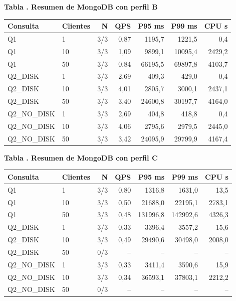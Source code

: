 \documentclass[12pt,letterpaper]{article}
\begin{document}
\par\begin{minipage}{\textwidth}\begin{center}\textbf{Tabla \thetable. Resumen de MongoDB con perfil B}\par\small\begin{tabular}{llrrrrr}\toprule Consulta & Clientes & N & QPS & P95 ms & P99 ms & CPU s \\ \midrule
Q1 & 1 & 3/3 & 0,87 & 1195,7 & 1221,5 & 0,4 \\
Q1 & 10 & 3/3 & 1,09 & 9899,1 & 10095,4 & 2429,2 \\
Q1 & 50 & 3/3 & 0,84 & 66195,5 & 69897,8 & 4103,7 \\
Q2\_DISK & 1 & 3/3 & 2,69 & 409,3 & 429,0 & 0,4 \\
Q2\_DISK & 10 & 3/3 & 4,01 & 2805,7 & 3000,1 & 2437,1 \\
Q2\_DISK & 50 & 3/3 & 3,40 & 24600,8 & 30197,7 & 4164,0 \\
Q2\_NO\_DISK & 1 & 3/3 & 2,69 & 404,8 & 418,8 & 0,4 \\
Q2\_NO\_DISK & 10 & 3/3 & 4,06 & 2795,6 & 2979,5 & 2445,0 \\
Q2\_NO\_DISK & 50 & 3/3 & 3,42 & 24095,9 & 29799,9 & 4167,4 \\
\bottomrule\end{tabular}\end{center}\end{minipage}\par
\par\begin{minipage}{\textwidth}\begin{center}\textbf{Tabla \thetable. Resumen de MongoDB con perfil C}\par\small\begin{tabular}{llrrrrr}\toprule Consulta & Clientes & N & QPS & P95 ms & P99 ms & CPU s \\ \midrule
Q1 & 1 & 3/3 & 0,80 & 1316,8 & 1631,0 & 13,5 \\
Q1 & 10 & 3/3 & 0,50 & 21688,0 & 22195,1 & 2783,1 \\
Q1 & 50 & 3/3 & 0,48 & 131996,8 & 142992,6 & 4326,3 \\
Q2\_DISK & 1 & 3/3 & 0,33 & 3396,4 & 3557,2 & 15,6 \\
Q2\_DISK & 10 & 3/3 & 0,49 & 29490,6 & 30498,0 & 2008,0 \\
Q2\_DISK & 50 & 0/3 & -- & -- & -- & -- \\
Q2\_NO\_DISK & 1 & 3/3 & 0,33 & 3411,4 & 3590,6 & 15,9 \\
Q2\_NO\_DISK & 10 & 3/3 & 0,34 & 36593,1 & 37803,1 & 2212,2 \\
Q2\_NO\_DISK & 50 & 0/3 & -- & -- & -- & -- \\
\bottomrule\end{tabular}\end{center}\end{minipage}\par
\end{document}
